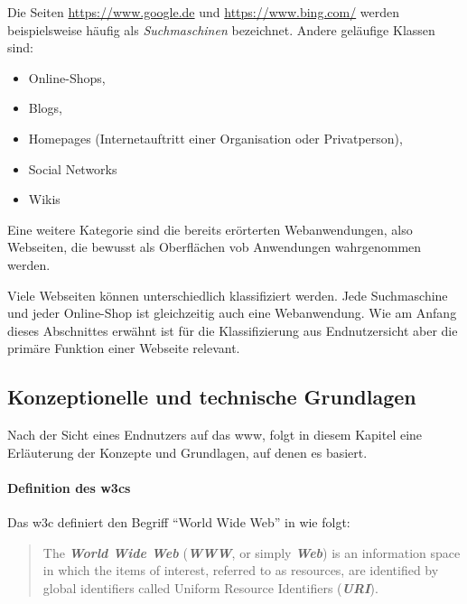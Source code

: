             Die Seiten \url{https://www.google.de} und \url{https://www.bing.com/}
            werden beispielsweise häufig als \textit{Suchmaschinen} bezeichnet.
            Andere geläufige Klassen sind:

            \begin{itemize}
                \item Online-Shops,
                \item Blogs,
                \item Homepages (Internetauftritt einer Organisation oder Privatperson),
                \item Social Networks
                \item Wikis
            \end{itemize}

            Eine weitere Kategorie sind die bereits erörterten Webanwendungen,
            also Webseiten, die bewusst als Oberflächen vob Anwendungen wahrgenommen werden.

            Viele Webseiten können unterschiedlich klassifiziert werden.
            Jede Suchmaschine und jeder Online-Shop ist gleichzeitig auch eine
            Webanwendung. Wie am Anfang dieses Abschnittes erwähnt ist für die
            Klassifizierung aus Endnutzersicht aber die primäre Funktion einer Webseite
            relevant.

        \subsection{Konzeptionelle und technische Grundlagen}
            Nach der Sicht eines Endnutzers auf das \gls{www},
            folgt in diesem Kapitel eine Erläuterung der Konzepte und Grundlagen,
            auf denen es basiert.

            \paragraph*{Definition des \glspl{w3c}}
            Das \gls{w3c} definiert den Begriff "`World Wide Web"' in \cite{w3c:wwwArch} wie folgt:
    
            \begin{quote}
                The \textit{\textbf{World Wide Web}} (\textit{\textbf{WWW}}, or simply \textit{\textbf{Web}})
                is an information space in which the items of interest, referred to as resources,
                are identified by global identifiers called Uniform Resource Identifiers (\textit{\textbf{URI}}).
            \end{quote}

